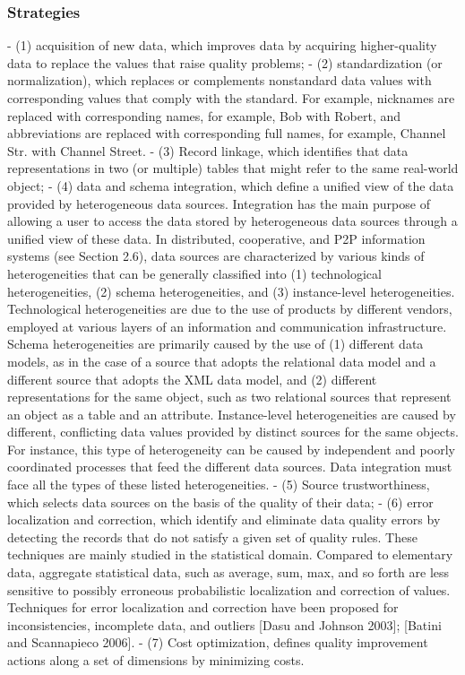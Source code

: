 \documentclass[pdftex,english,oribibl]{llncs}
\begin{document}
\subsubsection{Strategies}
- (1) acquisition of new data, which improves data by acquiring higher-quality data to replace the values that raise quality problems;
- (2) standardization (or normalization), which replaces or complements nonstandard data values with corresponding values that comply with the standard. For example, nicknames are replaced with corresponding names, for example, Bob with Robert, and abbreviations are replaced with corresponding full names, for example, Channel Str. with Channel Street.
- (3) Record linkage, which identifies that data representations in two (or multiple) tables that might refer to the same real-world object;
- (4) data and schema integration, which define a unified view of the data provided by heterogeneous data sources. Integration has the main purpose of allowing a user to access the data stored by heterogeneous data sources through a unified view of these data. In distributed, cooperative, and P2P information systems (see Section 2.6), data sources are characterized by various kinds of heterogeneities that can be generally classified into (1) technological heterogeneities, (2) schema heterogeneities, and (3) instance-level heterogeneities. Technological heterogeneities are due to the use of products by different vendors, employed at various layers of an information and communication infrastructure. Schema heterogeneities are primarily caused by the use of (1) different data models, as in the case of a source that adopts the relational data model and a different source that adopts the XML data model, and (2) different representations for the same object, such as two relational sources that represent an object as a table and an attribute. Instance-level heterogeneities are caused by different, conflicting data values provided by distinct sources for the same objects. For instance, this type of heterogeneity can be caused by independent and poorly coordinated processes that feed the different data sources. Data integration must face all the types of these listed heterogeneities.
- (5) Source trustworthiness, which selects data sources on the basis of the quality of their data;
- (6) error localization and correction, which identify and eliminate data quality errors by detecting the records that do not satisfy a given set of quality rules. These techniques are mainly studied in the statistical domain. Compared to elementary data, aggregate statistical data, such as average, sum, max, and so forth are less sensitive to possibly erroneous probabilistic localization and correction of values. Techniques for error localization and correction have been proposed for inconsistencies, incomplete data, and outliers [Dasu and Johnson 2003]; [Batini and Scannapieco 2006].
- (7) Cost optimization, defines quality improvement actions along a set of dimensions by minimizing costs.
\end{document}
